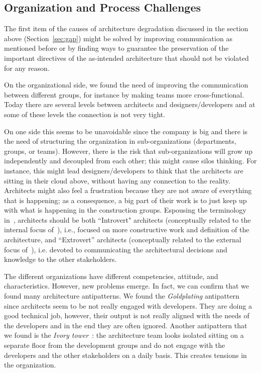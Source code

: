 \subsection{Organization and Process Challenges}\label{sec:organizationAndProcessChallenges}
The first item of the causes of architecture degradation discussed in the section above (Section~\ref{sec:gap}) might be solved by improving communication as mentioned before or by finding ways to guarantee the preservation of the  important directives of the as-intended architecture that should not be violated for any reason.

On the organizational side, we found the need of improving the communication between
different groups, for instance by making teams more cross-functional. Today
there are several levels between architects and designers/developers and at some of
these levels the connection is not very tight. 

On one side this seems to be unavoidable since the company is 
big and there is the need of structuring the organization in sub-organizations (departments, groups, or teams). 
However, there is the risk that sub-organizations will grow up independently and decoupled from each other; this might 
cause silos thinking.  
For instance, this might lead designers/developers to think
that the architects are sitting in their cloud above, without having
any connection to the reality. Architects might also feel
a frustration because they are not aware of everything that is happening; as a
consequence, a big part of their work is to just keep up with what is happening
in the construction groups. Espousing the terminology
in~\cite{whatindustrywants,IEEESoftwarePatrizio}, architects should be both ``Introvert" architects (conceptually related to the internal focus
of~\cite{Kruchten2008}), i.e., focused on more constructive work and definition of the architecture,
and 
``Extrovert'' architects (conceptually related to the external focus
of~\cite{Kruchten2008}), i.e. devoted to communicating the architectural
decisions and knowledge to the other stakeholders. 

The different organizations have different competencies, attitude, and
characteristics. However, new problems emerge. In fact, we can confirm that we
found many architecture antipatterns. We found the {\em Goldplating}
antipattern~\cite{Kruchten2008} since architects seem to be not
really engaged with developers. They are doing a good technical job, however,
their output is not really aligned with the needs of the developers and in the
end they are often ignored. Another antipattern that we found is the {\em Ivory
tower}~\cite{Kruchten2008}: the architecture team looks isolated
sitting on a separate floor from the development groups and do not engage with the
developers and the other stakeholders on a daily basis. This creates tensions in
the organization. 

